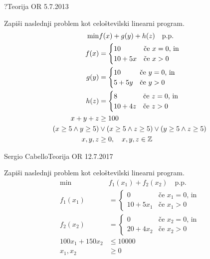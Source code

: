 \begin{naloga}{?}{Teorija OR 5.7.2013}
\begin{vprasanje}
Zapiši naslednji problem kot celoštevilski linearni program.
\begin{align*}
\min & f(x) + g(y) + h(z) \quad \text{p.p.} \\
f(x) &= \begin{cases}
        10      & \text{če $x = 0$, in} \\
        10 + 5x & \text{če $x > 0$}
        \end{cases} \\
g(y) &= \begin{cases}
        10     & \text{če $y = 0$, in} \\
        5 + 5y & \text{če $y > 0$}
        \end{cases} \\
h(z) &= \begin{cases}
        8       & \text{če $z = 0$, in} \\
        10 + 4z & \text{če $z > 0$}
        \end{cases} \\
x + y + z &\ge 100 \\
      (x \ge 5 \land y \ge 5)
&\lor (x \ge 5 \land z \ge 5)
 \lor (y \ge 5 \land z \ge 5) \\
x, y, z &\ge 0, \quad x, y, z \in \mathbb{Z}
\end{align*}
\end{vprasanje}
\begin{odgovor}
\end{odgovor}
\end{naloga}


\begin{naloga}{Sergio Cabello}{Teorija OR 12.7.2017}
\begin{vprasanje}
Zapiši naslednji problem kot celoštevilski linearni program.
\begin{align*}
\min & f_1(x_1) + f_2(x_2) \quad \text{p.p.} \\
f_1(x_1) &= \begin{cases}
            0         & \text{če $x_1 = 0$, in} \\
            10 + 5x_1 & \text{če $x_1 > 0$}
            \end{cases} \\
f_2(x_2) &= \begin{cases}
            0         & \text{če $x_2 = 0$, in} \\
            20 + 4x_2 & \text{če $x_2 > 0$}
            \end{cases} \\
100x_1 + 150x_2 &\le 10000 \\
x_1, x_2 &\ge 0
\end{align*}
\end{vprasanje}
\begin{odgovor}
\end{odgovor}
\end{naloga}


